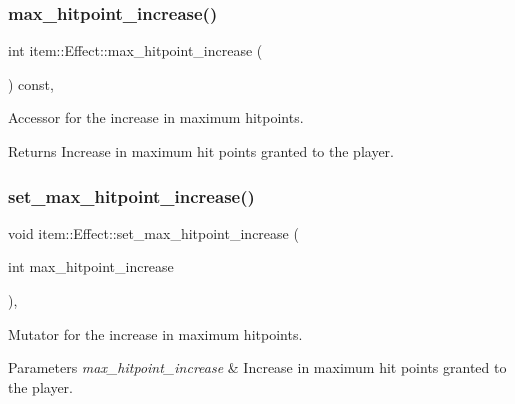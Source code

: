 \subsubsection{\texorpdfstring{max\+\_\+hitpoint\+\_\+increase()}{max\_hitpoint\_increase()}}
{\footnotesize\ttfamily int item\+::\+Effect\+::max\+\_\+hitpoint\+\_\+increase (\begin{DoxyParamCaption}{ }\end{DoxyParamCaption}) const\hspace{0.3cm}{\ttfamily [inline]}, {\ttfamily [noexcept]}}



Accessor for the increase in maximum hitpoints. 

\begin{DoxyReturn}{Returns}
Increase in maximum hit points granted to the player. 
\end{DoxyReturn}
\mbox{\label{classitem_1_1_effect_af2710ca17d043b8aeb3360fd991e3140}} 
\subsubsection{\texorpdfstring{set\+\_\+max\+\_\+hitpoint\+\_\+increase()}{set\_max\_hitpoint\_increase()}}
{\footnotesize\ttfamily void item\+::\+Effect\+::set\+\_\+max\+\_\+hitpoint\+\_\+increase (\begin{DoxyParamCaption}\item[{int}]{max\+\_\+hitpoint\+\_\+increase }\end{DoxyParamCaption})\hspace{0.3cm}{\ttfamily [inline]}, {\ttfamily [noexcept]}}



Mutator for the increase in maximum hitpoints. 


\begin{DoxyParams}{Parameters}
{\em max\+\_\+hitpoint\+\_\+increase} & Increase in maximum hit points granted to the player. \\
\hline
\end{DoxyParams}
\mbox{\label{classitem_1_1_effect_a9a6f54d0eab7dd13b2ef14e04f6ddb56}} 
